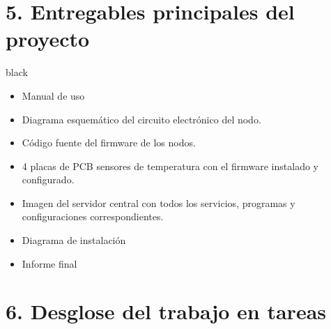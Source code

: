 \documentclass[11pt]{charter}
\begin{document}
\section{5. Entregables principales del proyecto}
\label{sec:entregables}

\begin{consigna}{black}
\begin{itemize}
\item Manual de uso
\item Diagrama esquemático del circuito electrónico del nodo.
\item Código fuente del firmware de los nodos.
\item 4 placas de PCB sensores de temperatura con el firmware instalado y configurado.
\item Imagen del servidor central con todos los servicios, programas y configuraciones correspondientes.
\item Diagrama de instalación
\item Informe final

\end{itemize}

\end{consigna}

\section{6. Desglose del trabajo en tareas}
\label{sec:wbs}
\end{document}
